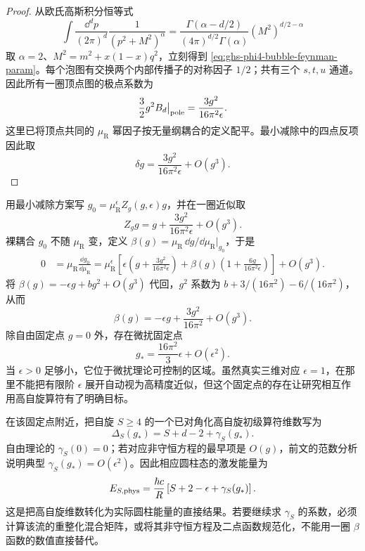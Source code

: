 \begin{proof}
从欧氏高斯积分恒等式
\begin{equation*}
\int\frac{\dd^dp}{(2\pi)^d}\frac1{(p^2+M^2)^\alpha}
=\frac{\Gamma(\alpha-d/2)}{(4\pi)^{d/2}\Gamma(\alpha)}(M^2)^{d/2-\alpha}
\end{equation*}
取 $\alpha=2$、$M^2=m^2+x(1-x)q^2$，立刻得到 \cref{eq:ghs-phi4-bubble-feynman-param}。每个泡图有交换两个内部传播子的对称因子 $1/2$；共有三个 $s,t,u$ 通道。因此所有一圈顶点图的极点系数为
\begin{equation*}
\frac32 g^2 B_d\big|_{\rm pole}
=\frac{3g^2}{16\pi^2\epsilon}.
\end{equation*}
这里已将顶点共同的 $\mu_{\mathrm R}$ 幂因子按无量纲耦合的定义配平。最小减除中的四点反项因此取
\begin{equation*}
\delta g=\frac{3g^2}{16\pi^2\epsilon}+O(g^3).
\end{equation*}
\end{proof}

用最小减除方案写 $g_0=\mu_{\mathrm R}^\epsilon Z_g(g,\epsilon)g$，并在一圈近似取
\begin{equation}\label{eq:ghs-phi4-coupling-renormalization}
 Z_gg=g+\frac{3g^2}{16\pi^2\epsilon}+O(g^3).
\end{equation}
裸耦合 $g_0$ 不随 $\mu_{\mathrm R}$ 变，定义 $\beta(g)=\mu_{\mathrm R}\,\dd g/\dd\mu_{\mathrm R}|_{g_0}$，于是
\begin{align*}
 0&=\mu_{\mathrm R}\frac{\dd g_0}{\dd\mu_{\mathrm R}}
 =\mu_{\mathrm R}^\epsilon\left[
 \epsilon\left(g+\frac{3g^2}{16\pi^2\epsilon}\right)
 +\beta(g)\left(1+\frac{6g}{16\pi^2\epsilon}\right)\right]+O(g^3).
\end{align*}
将 $\beta(g)=-\epsilon g+bg^2+O(g^3)$ 代回，$g^2$ 系数为 $b+3/(16\pi^2)-6/(16\pi^2)$，从而
\begin{equation}\label{eq:ghs-phi4-beta-function}
 \beta(g)=-\epsilon g+\frac{3g^2}{16\pi^2}+O(g^3).
\end{equation}
除自由固定点 $g=0$ 外，存在微扰固定点
\begin{equation}\label{eq:ghs-wilson-fisher-fixed-point}
 g_*=\frac{16\pi^2}{3}\epsilon+O(\epsilon^2).
\end{equation}
当 $\epsilon>0$ 足够小，它位于微扰理论可控制的区域。虽然真实三维对应 $\epsilon=1$，在那里不能把有限阶 $\epsilon$ 展开自动视为高精度近似，但这个固定点的存在让研究相互作用高自旋算符有了明确目标。


在该固定点附近，把自旋 $S\ge4$ 的一个已对角化高自旋初级算符维数写为
\begin{equation}\label{eq:ghs-wf-current-dimension}
 \Delta_S(g_*)=S+d-2+\gamma_S(g_*).
\end{equation}
自由理论的 $\gamma_S(0)=0$；若对应非守恒方程的最早项是 $O(g)$，前文的范数分析说明典型 $\gamma_S(g_*)=O(\epsilon^2)$。因此相应圆柱态的激发能量为
\begin{equation}\label{eq:ghs-wf-cylinder-energy}
 E_{S,\rm phys}=
 \frac{\hbar c}{R}\left[S+2-\epsilon+\gamma_S(g_*)\right].
\end{equation}
这是把高自旋维数转化为实际圆柱能量的直接结果。若要继续求 $\gamma_S$ 的系数，必须计算该流的重整化混合矩阵，或将其非守恒方程及二点函数规范化，不能用一圈 $\beta$ 函数的数值直接替代。

